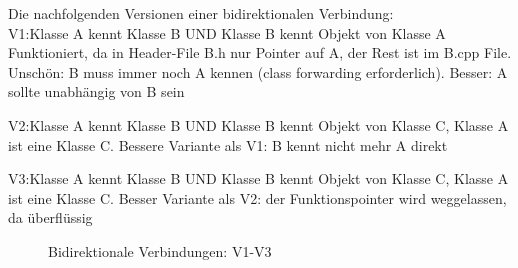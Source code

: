 Die nachfolgenden Versionen einer bidirektionalen Verbindung: \\
V1:Klasse A kennt Klasse B UND Klasse B kennt Objekt von Klasse A
Funktioniert, da in Header-File B.h nur Pointer auf A, der Rest ist im B.cpp File. Unschön: B muss immer noch A kennen (class forwarding erforderlich). Besser: A sollte unabhängig von B sein

V2:Klasse A kennt Klasse B UND Klasse B kennt Objekt von Klasse C, Klasse A ist eine Klasse C. Bessere Variante als V1: B kennt nicht mehr A direkt

V3:Klasse A kennt Klasse B UND Klasse B kennt Objekt von Klasse C, Klasse A ist eine Klasse C. Besser Variante als V2: der Funktionspointer wird weggelassen, da überflüssig

\begin{figure}[ht]
\caption[]{Bidirektionale Verbindungen: V1-V3}
\end{figure}


